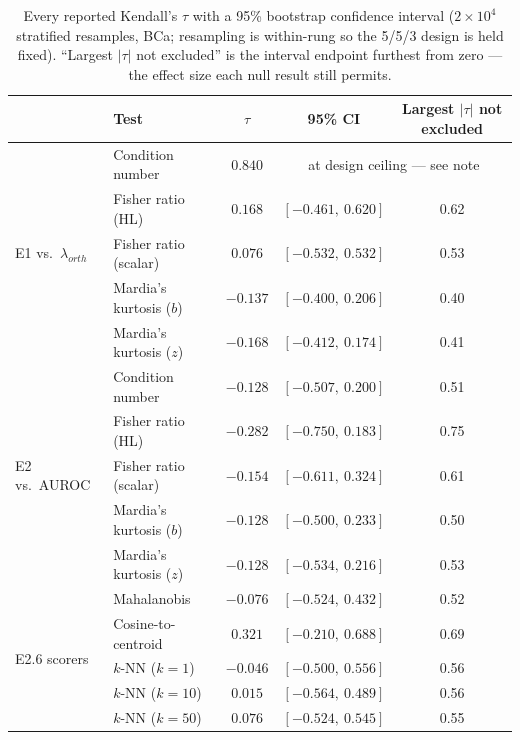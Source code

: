 \begin{table}[htbp]
\centering
\caption{Every reported Kendall's $\tau$ with a 95\% bootstrap confidence interval ($2\times10^{4}$ stratified resamples, BCa; resampling is within-rung so the 5/5/3 design is held fixed). ``Largest $|\tau|$ not excluded'' is the interval endpoint furthest from zero --- the effect size each null result still permits.}
\label{tab:s9-tau-ci}
\small
\begin{tabular}{llccc}
\toprule
& Test & $\tau$ & 95\% CI & Largest $|\tau|$ not excluded \\
\midrule
\multirow{5}{*}{E1 vs.\ $\lambda_{orth}$}
& Condition number        & $0.840$  & \multicolumn{2}{c}{at design ceiling --- see note} \\
& Fisher ratio (HL)       & $0.168$  & $[-0.461,\ 0.620]$ & 0.62 \\
& Fisher ratio (scalar)   & $0.076$  & $[-0.532,\ 0.532]$ & 0.53 \\
& Mardia's kurtosis ($b$) & $-0.137$ & $[-0.400,\ 0.206]$ & 0.40 \\
& Mardia's kurtosis ($z$) & $-0.168$ & $[-0.412,\ 0.174]$ & 0.41 \\
\midrule
\multirow{5}{*}{E2 vs.\ AUROC}
& Condition number        & $-0.128$ & $[-0.507,\ 0.200]$ & 0.51 \\
& Fisher ratio (HL)       & $-0.282$ & $[-0.750,\ 0.183]$ & 0.75 \\
& Fisher ratio (scalar)   & $-0.154$ & $[-0.611,\ 0.324]$ & 0.61 \\
& Mardia's kurtosis ($b$) & $-0.128$ & $[-0.500,\ 0.233]$ & 0.50 \\
& Mardia's kurtosis ($z$) & $-0.128$ & $[-0.534,\ 0.216]$ & 0.53 \\
\midrule
\multirow{8}{*}{E2.6 scorers}
& Mahalanobis             & $-0.076$ & $[-0.524,\ 0.432]$ & 0.52 \\
& Cosine-to-centroid      & $0.321$  & $[-0.210,\ 0.688]$ & 0.69 \\
& $k$-NN ($k=1$)          & $-0.046$ & $[-0.500,\ 0.556]$ & 0.56 \\
& $k$-NN ($k=10$)         & $0.015$  & $[-0.564,\ 0.489]$ & 0.56 \\
& $k$-NN ($k=50$)         & $0.076$  & $[-0.524,\ 0.545]$ & 0.55 \\

\end{tabular}
\end{table}
